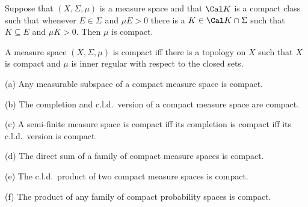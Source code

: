  Suppose that $(X,\Sigma,\mu)$ is a measure
space and that $\Cal K$ is a compact class such that whenever
$E\in\Sigma$ and
$\mu E>0$ there is a $K\in\Cal K\cap\Sigma$ such that $K\subseteq E$ and
$\mu K>0$.   Then $\mu$ is compact.


 A measure space $(X,\Sigma,\mu)$ is compact iff
there is a topology on $X$ such that $X$ is compact and $\mu$ is inner
regular with respect to the closed sets.


(a) Any measurable subspace of a compact measure space is compact.

(b) The completion and c.l.d.\ version of a compact measure space are
compact.

(c) A semi-finite measure space is compact iff its completion is compact
iff its c.l.d.\ version is compact.

(d) The direct sum of a family of compact measure spaces is compact.

(e) The c.l.d.\ product of two compact measure spaces is compact.

(f) The product of any family of compact probability spaces is compact.

